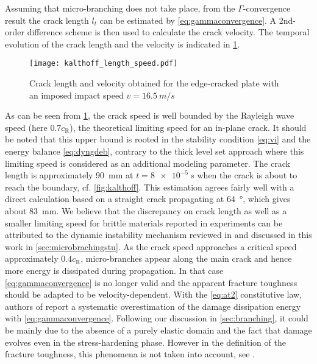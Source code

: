 Assuming that micro-branching does not take place, from the $\Gamma$-convergence result the crack length $l_t$ can be estimated by \eqref{eq:gammaconvergence}. A 2nd-order difference scheme is then used to calculate the crack velocity. The temporal evolution of the crack length and the velocity is indicated in \cref{fig:crack_length_speed}.
\begin{figure}[htbp]
\centering
\texttt{[image: kalthoff\_length\_speed.pdf]}
\caption{Crack length and velocity obtained for the edge-cracked plate with an imposed impact speed $v=\SI{16.5}{m/s}$} \label{fig:crack_length_speed}
\end{figure}
As can be seen from \cref{fig:crack_length_speed}, the crack speed is well bounded by the Rayleigh wave speed (here $0.7c_\mathrm{R}$), the theoretical limiting speed for an in-plane crack. It should be noted that this upper bound is rooted in the stability condition \eqref{eq:vi} and the energy balance \eqref{eq:dyngdeb}, contrary to the thick level set approach \cite{MoreauMoesPicartStainier:2015} where this limiting speed is considered as an additional modeling parameter. The crack length is approximately \SI{90}{mm} at $t=\SI{8e-5}{s}$ when the crack is about to reach the boundary, cf. \cref{fig:kalthoff}. This estimation agrees fairly well with a direct calculation based on a straight crack propagating at \SI{64}{\degree}, which gives about \SI{83}{mm}. We believe that the discrepancy on crack length as well as a smaller limiting speed for brittle materials reported in experiments can be attributed to the dynamic instability mechanism reviewed in \cite{FinebergMarder:1999} and discussed in this work in \cref{sec:microbrachingstu}. As the crack speed approaches a critical speed approximately $0.4c_\mathrm{R}$, micro-branches appear along the main crack and hence more energy is dissipated during propagation. In that case \eqref{eq:gammaconvergence} is no longer valid and the apparent fracture toughness should be adapted to be velocity-dependent. With the \eqref{eq:at2} constitutive law, authors of \cite{BordenVerhooselScottHughesLandis:2012,VignolletMayBorstVerhoosel:2014} report a systematic overestimation of the damage dissipation energy with \eqref{eq:gammaconvergence}. Following our discussion in \cref{sec:branching}, it could be mainly due to the absence of a purely elastic domain and the fact that damage evolves even in the stress-hardening phase. However in the definition of the fracture toughness, this phenomena is not taken into account, see \cite{BourdinFrancfortMarigo:2008}.

